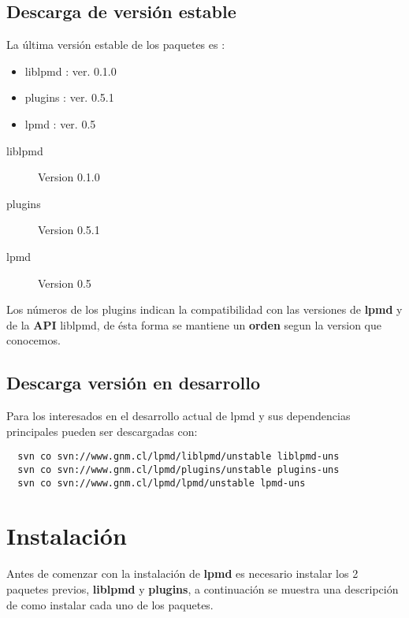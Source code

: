 \documentclass[a4paper,10pt]{scrbook}
\newcommand{\lpmd}{\textbf{lpmd }}
\begin{document}
\subsection{Descarga de versi\'on estable}

La \'ultima versi\'on estable de los paquetes es :

\begin{itemize}
 \item liblpmd : ver. 0.1.0
 \item plugins : ver. 0.5.1
 \item lpmd    : ver. 0.5
\end{itemize}

\begin{description}
 \item [liblpmd] Version 0.1.0
 \item [plugins] Version 0.5.1
 \item [lpmd] Version 0.5
\end{description}


Los n\'umeros de los plugins indican la compatibilidad con las versiones de \lpmd y de la \textbf{API} liblpmd, de \'esta forma se mantiene un \textbf{orden} segun la version que conocemos.

\subsection{Descarga versi\'on en desarrollo}

Para los interesados en el desarrollo actual de lpmd y sus dependencias principales pueden ser descargadas con:

\begin{center}
 \begin{verbatim}
  svn co svn://www.gnm.cl/lpmd/liblpmd/unstable liblpmd-uns
  svn co svn://www.gnm.cl/lpmd/plugins/unstable plugins-uns
  svn co svn://www.gnm.cl/lpmd/lpmd/unstable lpmd-uns
 \end{verbatim}
\end{center}

\section{Instalaci\'on}
Antes de comenzar con la instalaci\'on de \lpmd es necesario instalar los 2 paquetes previos, \textbf{liblpmd} y \textbf{plugins}, a continuaci\'on se muestra una descripci\'on de como instalar cada uno de los paquetes.
\end{document}
